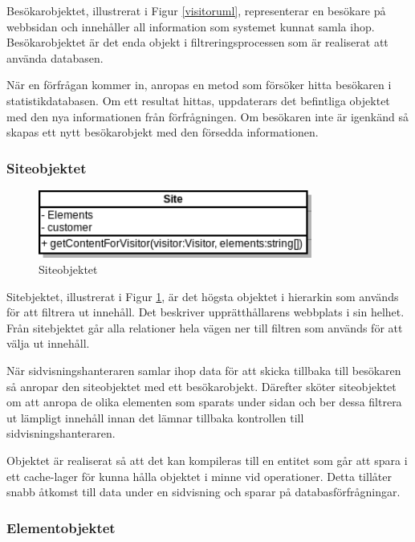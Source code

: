 Besökarobjektet, illustrerat i Figur \ref{visitoruml}, representerar en besökare på webbsidan och innehåller all information som systemet kunnat samla ihop. Besökarobjektet är det enda objekt i filtreringsprocessen som är realiserat att använda databasen.

När en förfrågan kommer in, anropas en metod som försöker hitta besökaren i statistikdatabasen. Om ett resultat hittas, uppdaterars det befintliga objektet med den nya informationen från förfrågningen. Om besökaren inte är igenkänd så skapas ett nytt besökarobjekt med den försedda informationen.

\subsubsection{Siteobjektet}

\begin{figure}[h!]
\centering
\includegraphics[width=90mm]{assets/images/umlSite.png}
\caption{Siteobjektet}
\label{siteuml}
\end{figure}

Sitebjektet, illustrerat i Figur \ref{siteuml}, är det högsta objektet i hierarkin som används för att filtrera ut innehåll. Det beskriver upprätthållarens webbplats i sin helhet. Från sitebjektet går alla relationer hela vägen ner till filtren som används för att välja ut innehåll.

När sidvisningshanteraren samlar ihop data för att skicka tillbaka till besökaren så anropar den siteobjektet med ett besökarobjekt. Därefter sköter siteobjektet om att anropa de olika elementen som sparats under sidan och ber dessa filtrera ut lämpligt innehåll innan det lämnar tillbaka kontrollen till sidvisningshanteraren.

Objektet är realiserat så att det kan kompileras till en entitet som går att spara i ett cache-lager för kunna hålla objektet i minne vid operationer. Detta tillåter snabb åtkomst till data under en sidvisning och sparar på databasförfrågningar.

\subsubsection{Elementobjektet}

